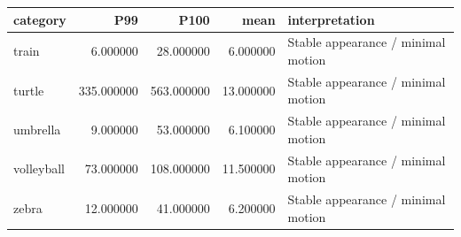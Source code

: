 \begin{tabular}{lrrrl}
\toprule
category & P99 & P100 & mean & interpretation \\
\midrule
train & 6.000000 & 28.000000 & 6.000000 & Stable appearance / minimal motion \\
turtle & 335.000000 & 563.000000 & 13.000000 & Stable appearance / minimal motion \\
umbrella & 9.000000 & 53.000000 & 6.100000 & Stable appearance / minimal motion \\
volleyball & 73.000000 & 108.000000 & 11.500000 & Stable appearance / minimal motion \\
zebra & 12.000000 & 41.000000 & 6.200000 & Stable appearance / minimal motion \\
\bottomrule
\end{tabular}
